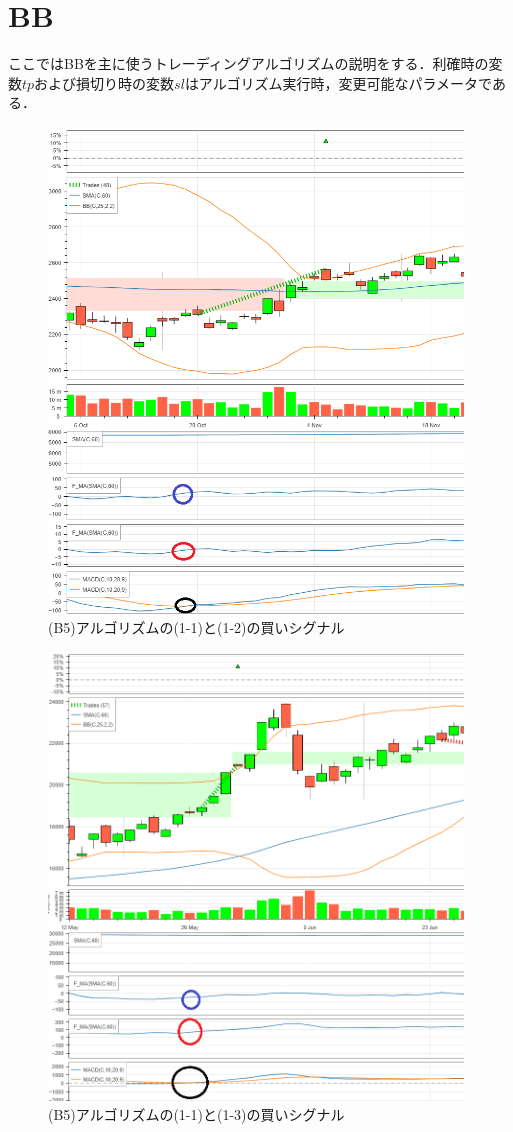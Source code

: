 \section{BB}
ここではBBを主に使うトレーディングアルゴリズムの説明をする．利確時の変数$tp$および損切り時の変数$sl$はアルゴリズム実行時，変更可能なパラメータである．
\begin{figure}[t]
  \centering
  \includegraphics[width=110mm]{fig/macd_and_nk_or_fma0_6857_paint.png}
  \caption{(B5)アルゴリズムの(1-1)と(1-2)の買いシグナル}
  \label{fig:macdfma0nk}
 \end{figure}

 \begin{figure}[t]
  \centering
  \includegraphics[width=110mm]{fig/macd_and_nk0_or_fma_paint.png}
  \caption{(B5)アルゴリズムの(1-1)と(1-3)の買いシグナル}
  \label{fig:macdfmank0}
 \end{figure}
